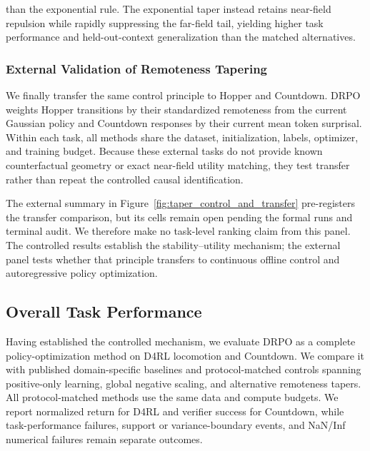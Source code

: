  than the exponential rule. The exponential taper instead retains
near-field repulsion while rapidly suppressing the far-field tail,
yielding higher task performance and held-out-context generalization
than the matched alternatives.

\subsubsection{External Validation of Remoteness Tapering}
\label{sec:external_tapers}

We finally transfer the same control principle to Hopper and Countdown.
DRPO weights Hopper transitions by their standardized remoteness from
the current Gaussian policy and Countdown responses by their current
mean token surprisal. Within each task, all methods share the dataset,
initialization, labels, optimizer, and training budget. Because these
external tasks do not provide known counterfactual geometry or exact
near-field utility matching, they test transfer rather than repeat the
controlled causal identification.

The external summary in Figure~\ref{fig:taper_control_and_transfer}
pre-registers the transfer comparison, but its cells remain open pending
the formal runs and terminal audit. We therefore make no task-level
ranking claim from this panel. The controlled results establish the
stability--utility mechanism; the external panel tests whether that
principle transfers to continuous offline control and autoregressive
policy optimization.

\subsection{Overall Task Performance}
\label{sec:overall_performance}

Having established the controlled mechanism, we evaluate DRPO as
a complete policy-optimization method on D4RL locomotion and Countdown.
We compare it with published domain-specific baselines and
protocol-matched controls spanning positive-only learning, global
negative scaling, and alternative remoteness tapers. All
protocol-matched methods use the same data and compute budgets. We
report normalized return for D4RL and verifier success for Countdown,
while task-performance failures, support or variance-boundary events,
and NaN/Inf numerical failures remain separate outcomes.


